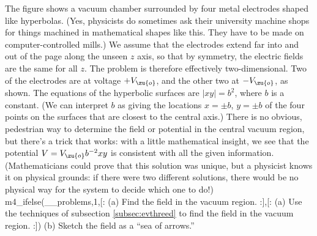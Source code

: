         The figure shows a vacuum chamber surrounded by four metal electrodes shaped
        like hyperbolas. (Yes, physicists do sometimes ask their university machine
        shops for things machined in mathematical shapes like this. They have to be made
        on computer-controlled mills.) We assume that the
        electrodes extend far into and out of the page along the unseen $z$ axis, so
        that by symmetry, the electric fields are the same for all $z$. The problem is
        therefore effectively two-dimensional. Two of the electrodes are at voltage $+V_\zu{o}$,
        and the other two at $-V_\zu{o}$, as shown. The equations of the hyperbolic surfaces
        are $|xy|=b^2$, where $b$ is a constant. (We can interpret $b$ as giving the locations
        $x=\pm b$, $y=\pm b$ of the four points on the surfaces that are closest to the
        central axis.) There is no obvious, pedestrian way to
        determine the field or potential in the central vacuum region, but there's a trick that
        works: with a little mathematical insight, we see that the potential $V=V_\zu{o}b^{-2}xy$
        is consistent with all the given information. (Mathematicians could prove that this
        solution was unique, but a physicist knows it on physical grounds: if there were two
        different solutions, there would be no physical way for the system to decide which
        one to do!)\\
m4_ifelse(__problems,1,[:%
(a) Find the field in the vacuum region.\answercheck
:],[:%
(a) Use the techniques of subsection \ref{subsec:evthreed}
        to find the field in the vacuum region.\answercheck
:])
(b) Sketch the field as a ``sea of arrows.''
